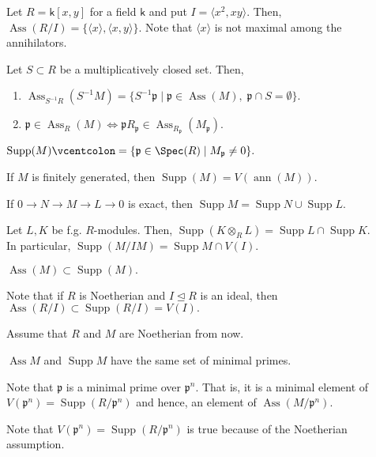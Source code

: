 \documentclass[12pt]{article}	%
\DeclareMathOperator{\Ass}{Ass}
\DeclareMathOperator{\Supp}{Supp}
\DeclareMathOperator{\ann}{ann}
\begin{document}
\begin{ex}
	Let $R = \mathsf{k}[x, y]$ for a field $\mathsf{k}$ and put $I = \langle x^2, xy\rangle.$ Then, $\Ass(R/I) = \{\langle x\rangle, \langle x, y\rangle\}.$ Note that $\langle x\rangle$ is not maximal among the annihilators.
\end{ex}

\begin{prop} \label{prop:assoflocalisation}
	Let $S \subset R$ be a multiplicatively closed set. Then,
	\begin{enumerate}
		\item $\Ass_{S^{-1}R}(S^{-1}M) = \{S^{-1}\mathfrak{p} \mid \mathfrak{p} \in \Ass(M),\;\mathfrak{p} \cap S = \emptyset\}.$
		\item $\mathfrak{p} \in \Ass_R(M) \iff \mathfrak{p}R_{\mathfrak{p}} \in \Ass_{R_{\mathfrak{p}}}(M_{\mathfrak{p}}).$
	\end{enumerate}
\end{prop}

\begin{defn}%
	$\Supp(M) \vcentcolon= \{\mathfrak{p} \in \Spec(R) \mid M_{\mathfrak{p}} \neq 0\}.$
\end{defn}
\begin{prop}
	If $M$ is finitely generated, then $\Supp(M) = V(\ann(M)).$
\end{prop}
\begin{prop}
	If $0 \to N \to M \to L \to 0$ is exact, then $\Supp M = \Supp N \cup \Supp L.$
\end{prop}
\begin{prop}
	Let $L, K$ be f.g. $R$-modules. Then, $\Supp(K \otimes_R L) = \Supp L \cap \Supp K.$\\
	In particular, $\Supp(M/IM) = \Supp M \cap V(I).$
\end{prop}

\begin{prop}
	$\Ass(M) \subset \Supp(M).$
\end{prop}
Note that if $R$ is Noetherian and $I \unlhd R$ is an ideal, then $\Ass(R/I) \subset \Supp(R/I) = V(I).$

\begin{disc}
	Assume that $R$ and $M$ are Noetherian from now.
\end{disc}

\begin{prop}
	$\Ass M$ and $\Supp M$ have the same set of minimal primes.
\end{prop}
\begin{rem}
	Note that $\mathfrak{p}$ is a minimal prime over $\mathfrak{p}^n.$ That is, it is a minimal element of $V(\mathfrak{p}^n) = \Supp(R/\mathfrak{p}^n)$ and hence, an element of $\Ass(M/\mathfrak{p}^n).$

	Note that $V(\mathfrak{p}^n) = \Supp(R/\mathfrak{p}^n)$ is true because of the Noetherian assumption.
\end{rem}
\end{document}
